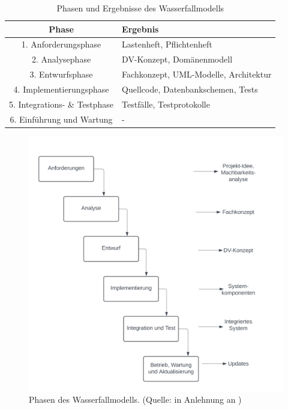 \begin{table}[]
    \centering
    \setlength{\tabcolsep}{0.5em}
    \def\arraystretch{1.5}
    \begin{tabular}{|c|l|}
        \hline
        \textbf{Phase} & \textbf{Ergebnis}                                             \\ \hline
         1. Anforderungsphase      & Lastenheft, Pflichtenheft\\ \hline
        2. Analysephase      & DV-Konzept, Domänenmodell \\ \hline
        3. Entwurfsphase      & Fachkonzept, UML-Modelle, Architektur \\ \hline
        4. Implementierungsphase      & Quellcode, Datenbankschemen, Tests \\ \hline
        5. Integrations- \& Testphase      & Testfälle, Testprotokolle \\ \hline
        6. Einführung und Wartung      & - \\ \hline
    \end{tabular}
    \caption{Phasen und Ergebnisse des Wasserfallmodells}
\end{table}



\begin{figure}
    \centering
    \includegraphics[scale=0.3]{chapters/Anhang/CheatSheets/img/wasserfallmodell}
    \caption{Phasen des Wasserfallmodells. (Quelle: in Anlehnung an \cite[318, Abbildung 14-3]{AABG14n})}
    \label{fig:wasserfallmodell_cc}
\end{figure}